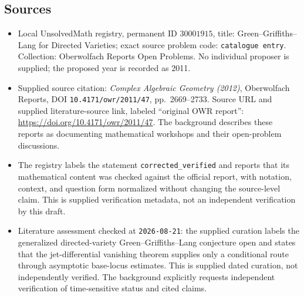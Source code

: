 \documentclass[11pt]{article}
\begin{document}
\subsection{Sources}
\begin{itemize}
\item Local UnsolvedMath registry, permanent ID \(30001915\), title: Green--Griffiths--Lang for Directed Varieties; exact source problem code: \texttt{catalogue entry}. Collection: Oberwolfach Reports Open Problems. No individual proposer is supplied; the proposed year is recorded as 2011.
\item Supplied source citation: \emph{Complex Algebraic Geometry (2012)}, Oberwolfach Reports, DOI \texttt{10.4171/owr/2011/47}, pp.\ 2669--2733. Source URL and supplied literature-source link, labeled ``original OWR report'': \url{https://doi.org/10.4171/owr/2011/47}. The background describes these reports as documenting mathematical workshops and their open-problem discussions.
\item The registry labels the statement \texttt{corrected\_verified} and reports that its mathematical content was checked against the official report, with notation, context, and question form normalized without changing the source-level claim. This is supplied verification metadata, not an independent verification by this draft.
\item Literature assessment checked at \texttt{2026-08-21}: the supplied curation labels the generalized directed-variety Green--Griffiths--Lang conjecture open and states that the jet-differential vanishing theorem supplies only a conditional route through asymptotic base-locus estimates. This is supplied dated curation, not independently verified. The background explicitly requests independent verification of time-sensitive status and cited claims.
\end{itemize}
\end{document}
